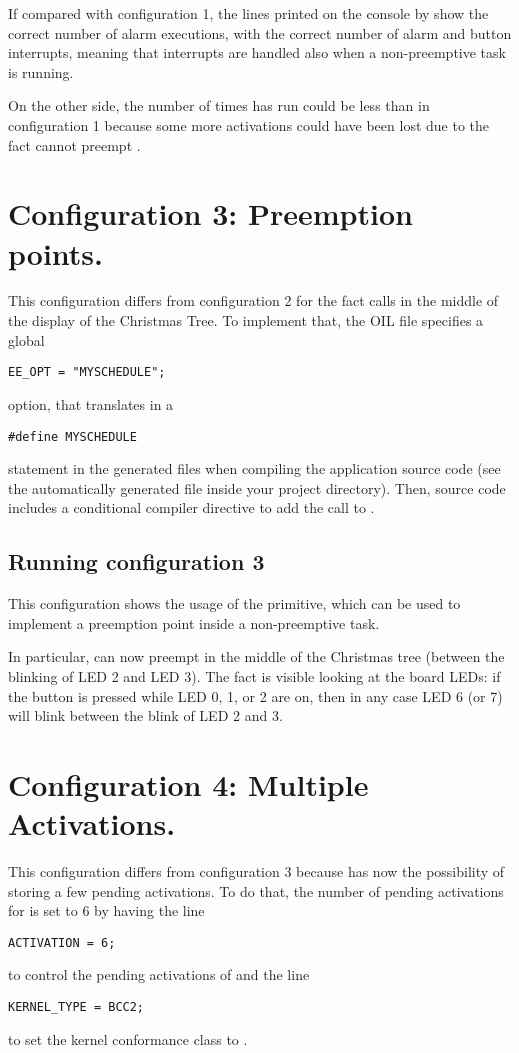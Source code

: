 If compared with configuration 1, the lines printed on the console by
 show the correct number of alarm executions, with the
correct number of alarm and button interrupts, meaning that interrupts
are handled also when a non-preemptive task is running.

On the other side, the number of times  has run could be
less than in configuration 1 because some more activations could have
been lost due to the fact  cannot preempt .



\section{Configuration 3: Preemption points.}

This configuration differs from configuration 2 for the fact
 calls  in the middle of the display of the
Christmas Tree.  To implement that, the OIL file specifies a global 

\begin{lstlisting}
EE_OPT = "MYSCHEDULE";
\end{lstlisting}
option, that translates in a 
\begin{lstlisting}
#define MYSCHEDULE
\end{lstlisting}
statement in the generated files when compiling the application source
code (see the automatically generated file
 inside your project directory). Then,
 source code includes a conditional compiler directive to
add the call to .


\subsection{Running configuration 3}
This configuration shows the usage of the
 primitive, which can be used to implement a preemption
point inside a non-preemptive task.

In particular,  can now preempt  in the middle of
the Christmas tree (between the blinking of LED 2 and LED 3). The fact
is visible looking at the board LEDs: if the button is pressed while
LED 0, 1, or 2 are on, then in any case LED 6 (or 7) will blink
between the blink of LED 2 and 3.


\section{Configuration 4: Multiple Activations.}
This configuration differs from configuration 3 because  has
now the possibility of storing a few pending activations. To do that,
the number of pending activations for  is set to 6 by having the line
\begin{lstlisting}
ACTIVATION = 6;
\end{lstlisting}
to control the pending activations of  and the line
\begin{lstlisting}
KERNEL_TYPE = BCC2;
\end{lstlisting}
to set the kernel conformance class to .

